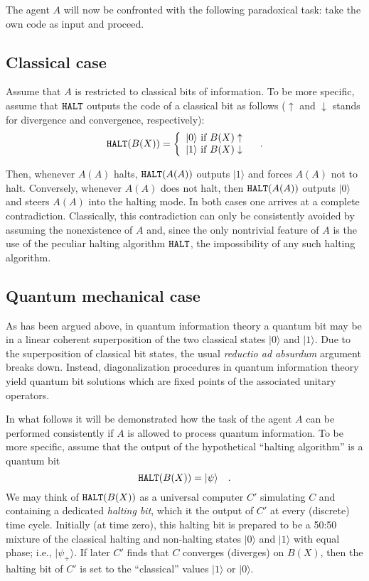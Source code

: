 \documentclass[prl,amsfonts,amsmath,showpacs,showkeys,preprint]{revtex4}
\begin{document}
The agent $A$ will now be confronted with the following paradoxical
task:  take the own code as input and proceed.

\subsection{Classical case}
 Assume that $A$ is
restricted to classical bits of information.
To be more specific,
assume that ${\tt HALT}$ outputs the code of a classical bit as follows
($\uparrow$ and $\downarrow$ stands for divergence and convergence,
respectively):
\begin{equation}
{\tt HALT} ( B(X) ) =\left\{
 \begin{array}{l}
\vert 0 \rangle \mbox{ if } B(X) \uparrow
\\
\vert 1 \rangle \mbox{ if } B(X) \downarrow \\
\end{array}
 \right.
\quad .
\label{el:halt}
\end{equation}


Then, whenever $A(A)$
halts, ${\tt HALT}(A(A))$ outputs $\vert 1\rangle $ and forces $A(A)$ not to halt.
Conversely,
whenever $A(A)$ does not halt, then ${\tt HALT}(A(A))$ outputs $\vert 0\rangle $
and steers
$A(A)$ into the halting mode.  In both cases one arrives at a complete
contradiction.  Classically, this contradiction can only be consistently
avoided by assuming the nonexistence of $A$ and, since the only
nontrivial feature of $A$ is the use of the peculiar halting algorithm
${\tt HALT}$, the impossibility of any such halting algorithm.


\subsection{Quantum mechanical case}
As has been argued above, in quantum information theory
a quantum bit may be in a linear coherent
superposition
of the two classical states $\vert 0\rangle$ and $\vert 1\rangle$.
Due to the superposition of classical bit
states, the usual {\it reductio ad absurdum} argument breaks down.
Instead, diagonalization procedures in
quantum information theory yield quantum bit solutions which are fixed points
of the associated unitary operators.


In what follows it will be demonstrated how the task of the agent $A$
can be performed consistently if
$A$ is allowed to process quantum information.
To be more specific, assume that the output of the hypothetical
``halting algorithm'' is a quantum bit
\begin{equation}
{\tt HALT} ( B(X) ) = \vert \psi \rangle
\quad .
\end{equation}
We may think of   ${\tt HALT} ( B(X) )$ as a universal computer $C'$
simulating $C$ and containing a dedicated {\em halting bit}, which it
the output of $C'$
at every (discrete) time cycle. Initially (at time zero),
this halting bit is prepared to be a 50:50 mixture of the
classical halting and non-halting states $\vert 0\rangle$ and $\vert 1\rangle$ with equal phase; i.e.,
$\vert \psi_+ \rangle$. If later $C'$ finds that $C$ converges
(diverges) on $B(X)$, then the halting bit of $C'$ is set to the
``classical'' values $\vert 1 \rangle$ or $\vert 0 \rangle$.
\end{document}
